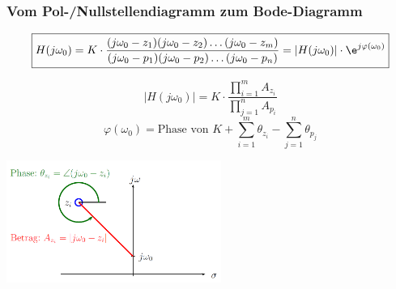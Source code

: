 \subsubsection{Vom Pol-/Nullstellendiagramm zum Bode-Diagramm }
\begin{minipage}[b]{12cm}
  \[\boxed{ H(j\omega_0) = K \cdot \frac{(j\omega_0 - z_1)(j\omega_0-z_2)\ldots(j\omega_0-z_m)}
  {(j\omega_0-p_1)(j\omega_0-p_2)\ldots(j\omega_0-p_n)} = |H(j\omega_0)|\cdot \e^{j\varphi(\omega_0)}}\]

  \[ |H(j\omega_0)| = K \cdot \frac{\prod\limits_{i=1}^{m} A_{z_i}}{\prod\limits_{j=1}^{n} A_{p_i}}\]
  \[ \varphi(\omega_0) = \text{Phase von }K + \sum\limits_{i=1}^m \theta_{z_i} - \sum\limits_{j=1}^n \theta_{p_j}\]
\end{minipage}
\begin{minipage}[b]{7cm}
  \includegraphics[width=7cm]{./images/PN_Diagramm.png}
\end{minipage}

